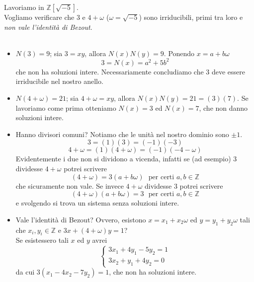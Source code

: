 \begin{esercizio}
Lavoriamo in $\mathbb{Z}[\sqrt{-5}]$. \\ Vogliamo verificare che 3 e $4+\omega$ ($\omega=\sqrt{-5}$) sono irriducibili, primi tra loro e \textit{non vale l'identità di Bezout}. \\ \\
\begin{itemize}
	\item $N(3)=9$; sia $3=xy$, allora $N(x)N(y)=9$. Ponendo $x=a+b\omega$
	\begin{equation*}
	3=N(x)=a^2+5b^2
	\end{equation*}
	che non ha soluzioni intere. Necessariamente concludiamo che 3 deve essere irriducibile nel nostro anello.
	\item $N(4+\omega)=21$; sia $4+\omega=xy$, allora $N(x)N(y)=21=(3)(7)$. Se lavoriamo come prima otteniamo $N(x)=3$ ed $N(x)=7$, che non danno soluzioni intere.
	\item Hanno divisori comuni? Notiamo che le unità nel nostro dominio sono $\pm1$.
	\begin{equation*}
	3=(1)(3)=(-1)(-3)
	\end{equation*}
	\begin{equation*}
	4+\omega=(1)(4+\omega)=(-1)(-4-\omega)
	\end{equation*}
	Evidentemente i due non si dividono a vicenda, infatti se (ad esempio) 3 dividesse $4+\omega$ potrei scrivere
	\begin{equation*}
	(4+\omega)=3(a+b\omega) \ \ \ \text{per certi $a,b\in\mathbb{Z}$}
	\end{equation*}
	che sicuramente non vale. Se invece $4+\omega$ dividesse 3 potrei scrivere
	\begin{equation*}
	(4+\omega)(a+b\omega)=3 \ \ \ \text{per certi $a,b\in\mathbb{Z}$}
	\end{equation*}
	e svolgendo si trova un sistema senza soluzioni intere.
	\item Vale l'identità di Bezout? Ovvero, esistono $x=x_1+x_2\omega$ ed $y=y_1+y_2\omega$ tali che $x_i,y_i\in\mathbb{Z}$ e $3x+(4+\omega)y=1$?\\ Se esistessero tali $x$ ed $y$ avrei
	\begin{equation*}
		\begin{cases}
			3x_1+4y_1-5y_2=1\\
			3x_2+y_1+4y_2=0
		\end{cases}
	\end{equation*}
	da cui $3(x_1-4x_2-7y_2)=1$, che non ha soluzioni intere.
\end{itemize}
\end{esercizio}
